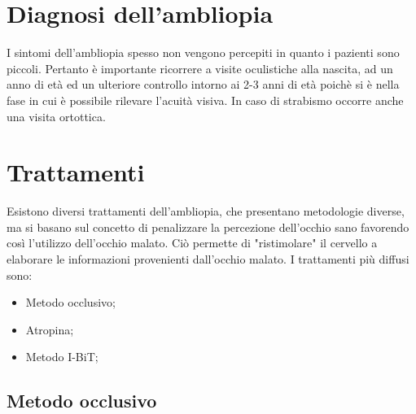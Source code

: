 \documentclass[12pt,a4paper,openright,twoside]{book}
\begin{document}
    \section{Diagnosi dell'ambliopia}
    I sintomi dell'ambliopia spesso non vengono percepiti in quanto i pazienti sono piccoli. Pertanto è importante ricorrere a visite oculistiche alla nascita, ad un anno di età ed un ulteriore controllo intorno ai 2-3 anni di età poichè si è nella fase in 
    cui è possibile rilevare l'acuità visiva. In caso di strabismo occorre anche una visita ortottica.
    \section{Trattamenti}
    Esistono diversi trattamenti dell'ambliopia, che presentano metodologie diverse, ma si basano sul concetto di penalizzare la percezione dell'occhio sano favorendo così l'utilizzo dell'occhio malato. Ciò permette di "ristimolare" il cervello a elaborare le informazioni 
    provenienti dall'occhio malato. I trattamenti più diffusi sono:
    \begin{itemize}
    	\item Metodo occlusivo;
    	\item Atropina;
    	\item Metodo I-BiT;
    \end{itemize}
    \subsection{Metodo occlusivo}
  
\end{document}
